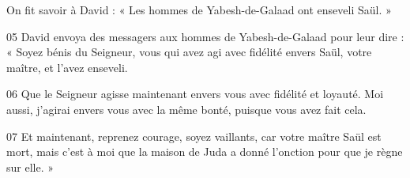 On fit savoir à David : « Les hommes de Yabesh-de-Galaad ont enseveli Saül. »

05 David envoya des messagers aux hommes de Yabesh-de-Galaad pour leur dire : « Soyez bénis du Seigneur, vous qui avez agi avec fidélité envers Saül, votre maître, et l’avez enseveli.

06 Que le Seigneur agisse maintenant envers vous avec fidélité et loyauté. Moi aussi, j’agirai envers vous avec la même bonté, puisque vous avez fait cela.

07 Et maintenant, reprenez courage, soyez vaillants, car votre maître Saül est mort, mais c’est à moi que la maison de Juda a donné l’onction pour que je règne sur elle. »
